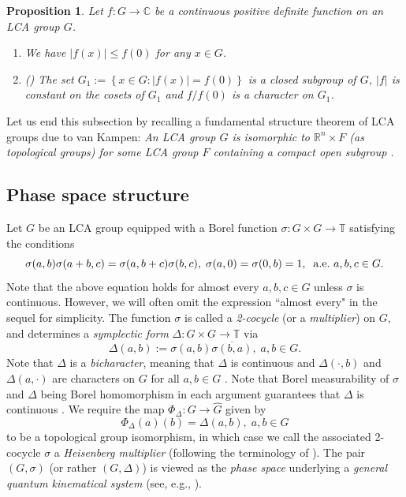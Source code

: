 \documentclass[12pt,reqno]{amsart}
\newtheorem{prop}[thm]{Proposition}
\theoremstyle{definition}
\theoremstyle{definition}
\theoremstyle{definition}
\numberwithin{thm}{section}
\numberwithin{equation}{section}
\newcommand{\Real}{\mathbb R}
\newcommand{\set}[1]{\left\{#1\right\}}
\newcommand{\Comp}{\mathbb{C}}
\newcommand{\tor}{\mathbb{T}}
\begin{document}
\begin{prop}\label{prop-posdef}
Let $f: G\to \Comp$ be a continuous positive definite function on an LCA group $G$.
\begin{enumerate}

    \item We have $|f(x)| \le f(0)$ for any $x\in G$.
    
    \item (\cite[Corollary 32.7]{HewittRoss2}) The set $G_1:=\set{x\in G: |f(x)|=f(0)}$ is a closed subgroup of $G$, $|f|$ is constant on the cosets of $G_1$ and $f/f(0)$ is a character on $G_1$. 
\end{enumerate}
\end{prop}


Let us end this subsection by recalling a fundamental structure theorem of LCA groups due to van Kampen: {\it An LCA group $G$ is isomorphic to $\Real^n \times F$ (as topological groups) for some LCA group $F$ containing a compact open subgroup \cite[24.30]{HewittRoss}.}


\subsection{Phase space structure}

Let $G$ be an LCA group equipped with a Borel function $\sigma: G\times G \to \tor$ satisfying the conditions 
    \begin{equation} \notag
    \sigma(a,b)\sigma(a+b,c) = \sigma(a,b+c)\sigma(b,c),\; \sigma(a,0) = \sigma(0,b) = 1,\;\; \mathrm{a.e.} \ a,b,c\in G.    
    \end{equation}
    Note that the above equation holds for almost every $a,b,c\in G$ unless $\sigma$ is continuous. However, we will often omit the expression ``almost every" in the sequel for simplicity. The function $\sigma$ is called a {\em 2-cocycle} (or a {\em multiplier}) on $G$, and determines a  {\em symplectic form} $\Delta:G\times G\to\tor$ via
    \begin{equation}\label{eq-symplectic-form-def}
    \Delta(a,b):= \sigma(a,b)\overline{\sigma(b,a)},\; a,b\in G.
    \end{equation}
Note that $\Delta$ is a {\em bicharacter}, meaning that $\Delta$ is continuous and $\Delta(\cdot,b)$ and $\Delta(a,\cdot)$ are characters on $G$ for all $a, b\in G$ \cite[p.533]{DigernesVaradarajan04}. Note that Borel measurability of $\sigma$ and $\Delta$ being Borel homomorphism in each argument guarantees that $\Delta$ is continuous \cite[p.281]{Mackey}. We require the map $\Phi_{\Delta}: G \to \widehat{G}$ given by
    \begin{equation}\label{eq-symplectic-iso}\Phi_{\Delta}(a)(b) = \Delta(a,b),\; a,b\in G
    \end{equation}
to be a topological group isomorphism, in which case we call the associated 2-cocycle $\sigma$ a {\em Heisenberg multiplier} (following the terminology of \cite{DigernesVaradarajan04}). The pair $(G,\sigma)$ (or rather $(G,\Delta)$) is viewed as the {\em phase space} underlying a {\em general quantum kinematical system} (see, e.g., \cite{DigernesVaradarajan04}).
\end{document}
